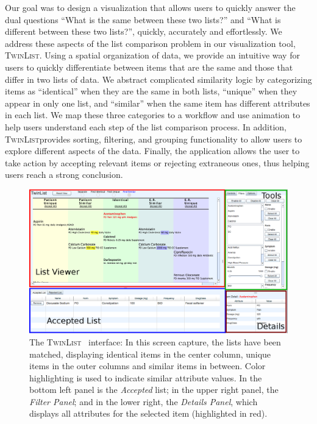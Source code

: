 \documentclass{chi2009}
\newcommand{\TwinList}{\textsc{TwinList}}
\newcommand{\Details}{\textit{Details Panel}}
\newcommand{\Filters}{\textit{Filter Panel}}
\begin{document}
Our goal was to design a visualization that allows users to quickly answer the dual questions ``What is the same between these two lists?'' and ``What is different between these two lists?'', quickly, accurately and effortlessly. We address these aspects of the list comparison problem in our visualization tool, \TwinList. Using a spatial organization of data, we provide an intuitive way for users to quickly differentiate between items that are the same and those that differ in two lists of data. We abstract complicated similarity logic by categorizing items as ``identical'' when they are the same in both lists, ``unique'' when they appear in only one list, and ``similar'' when the same item has different attributes in each list. We map these three categories to a workflow and use animation to help users understand each step of the list comparison process. In addition, \TwinList provides sorting, filtering, and grouping functionality to allow users to explore different aspects of the data. Finally, the application allows the user to take action by accepting relevant items or rejecting extraneous ones, thus helping users reach a strong conclusion. 

\begin{figure}[t]
\begin{center}
\includegraphics[width=1\linewidth]{img/interface2.png}
\end{center}
   \caption{The \TwinList~ interface: In this screen capture, the lists have been matched, displaying identical items in the center column, unique items in the outer columns and similar items in between. Color highlighting is used to indicate similar attribute values. In the bottom left panel is the \textit{Accepted} list; in the upper right panel, the \Filters; and in the lower right, the \Details, which displays all attributes for the selected item (highlighted in red).}
   \label{fig:interface}
\end{figure}
\end{document}
